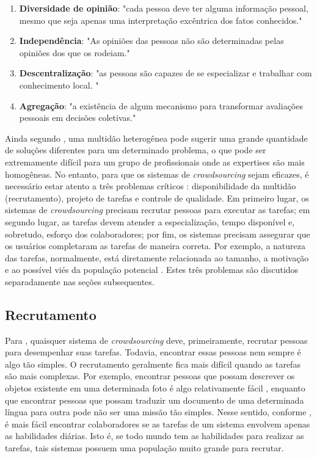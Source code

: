\begin{enumerate}
\item \textbf{Diversidade de opinião}: "cada pessoa deve ter alguma informação pessoal, mesmo que seja apenas uma interpretação excêntrica dos fatos conhecidos." 
\item \textbf{Independência}: "As opiniões das pessoas não são determinadas pelas opiniões dos que os rodeiam." 
\item \textbf{Descentralização}: "as pessoas são capazes de se especializar e trabalhar com conhecimento local. "
\item \textbf{Agregação}: "a existência de algum mecanismo para transformar avaliações pessoais em decisões coletivas."
\end{enumerate}

Ainda segundo \cite{surowiecki2005}, uma multidão heterogênea pode sugerir uma grande quantidade de soluções diferentes para um determinado problema, o que pode ser extremamente difícil para um grupo de profissionais onde as expertises são mais homogêneas. No entanto, para que os sistemas de \textit{crowdsourcing} sejam eficazes, é necessário estar atento a três problemas críticos \citep{Hu2012}:  disponibilidade da multidão (recrutamento), projeto de tarefas e controle de qualidade. Em primeiro lugar, os sistemas de \textit{crowdsourcing} precisam recrutar pessoas para executar as tarefas; em segundo lugar, as tarefas devem atender a especialização, tempo disponível e, sobretudo, esforço dos colaboradores; por fim, os sistemas precisam assegurar que os usuários completaram as tarefas de maneira correta. Por exemplo, a natureza das tarefas, normalmente, está diretamente relacionada ao tamanho, a motivação e ao possível viés da população potencial \citep{Hu2012}. Estes três problemas são discutidos separadamente nas seções subsequentes.

\subsection{Recrutamento}
Para \cite{Hu2012}, quaisquer sistema de \textit{crowdsourcing} deve, primeiramente, recrutar pessoas para desempenhar suas tarefas. Todavia, encontrar essas pessoas nem sempre é algo tão simples. O recrutamento geralmente fica mais difícil quando as tarefas são mais complexas. Por exemplo, encontrar pessoas que possam descrever os objetos existente em uma determinada foto é algo relativamente fácil \citep{Von2004}, enquanto que encontrar pessoas que possam traduzir um documento de uma determinada língua para outra \citep{Zaidan2011} pode não ser uma missão tão simples. Nesse sentido, conforme \cite{Hu2012}, é mais fácil encontrar colaboradores se as tarefas de um sistema envolvem apenas as habilidades diárias. Isto é, se todo mundo tem as habilidades para realizar as tarefas, tais sistemas possuem uma população muito grande para recrutar. 

